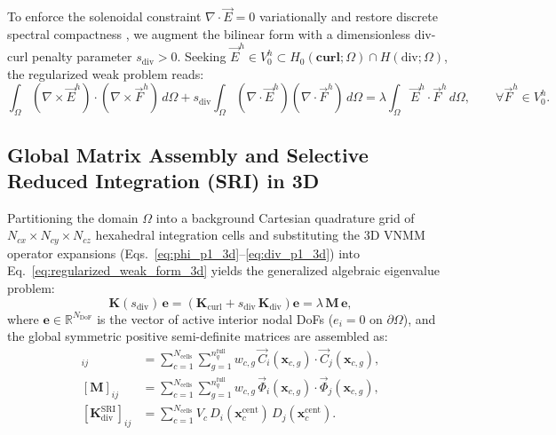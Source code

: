 \documentclass[preprint,12pt]{elsarticle}
\newcommand{\curl}{\nabla \times}
\newcommand{\divg}{\nabla \cdot}
\newcommand{\R}{\mathbb{R}}
\newcommand{\Hdiv}{H(\text{div};\Omega)}
\begin{document}
To enforce the solenoidal constraint $\divg\vec{E} = 0$ variationally and restore discrete spectral compactness \cite{Costabel2000, Boffi2010}, we augment the bilinear form with a dimensionless div-curl penalty parameter $s_{\text{div}} > 0$. Seeking $\vec{E}^h \in V_0^h \subset H_0(\mathbf{curl};\Omega) \cap \Hdiv$, the regularized weak problem reads:
\begin{equation}
    \int_\Omega (\curl\vec{E}^h)\cdot(\curl\vec{F}^h)\,d\Omega + s_{\text{div}} \int_\Omega (\divg\vec{E}^h)(\divg\vec{F}^h)\,d\Omega = \lambda \int_\Omega \vec{E}^h\cdot\vec{F}^h\,d\Omega, \qquad \forall \vec{F}^h \in V_0^h.
    \label{eq:regularized_weak_form_3d}
\end{equation}

\subsection{Global Matrix Assembly and Selective Reduced Integration (SRI) in 3D}
\label{subsec:sri_assembly_3d}

Partitioning the domain $\Omega$ into a background Cartesian quadrature grid of $N_{cx} \times N_{cy} \times N_{cz}$ hexahedral integration cells and substituting the 3D VNMM operator expansions (Eqs.~\eqref{eq:phi_p1_3d}--\eqref{eq:div_p1_3d}) into Eq.~\eqref{eq:regularized_weak_form_3d} yields the generalized algebraic eigenvalue problem:
\begin{equation}
    \mathbf{K}(s_{\text{div}})\,\mathbf{e} = \left( \mathbf{K}_{\text{curl}} + s_{\text{div}}\,\mathbf{K}_{\text{div}} \right)\mathbf{e} = \lambda\,\mathbf{M}\,\mathbf{e},
    \label{eq:discrete_eig_3d}
\end{equation}
where $\mathbf{e} \in \R^{N_{\text{DoF}}}$ is the vector of active interior nodal DoFs ($e_i = 0$ on $\partial\Omega$), and the global symmetric positive semi-definite matrices are assembled as:
\begin{align}
    [\mathbf{K}_{\text{curl}}]_{ij} &= \sum_{c=1}^{N_{\text{cells}}} \sum_{g=1}^{n_q^{\text{full}}} w_{c,g}\,\vec{C}_i(\mathbf{x}_{c,g}) \cdot \vec{C}_j(\mathbf{x}_{c,g}), \label{eq:K_curl_assembly_3d} \\
    [\mathbf{M}]_{ij} &= \sum_{c=1}^{N_{\text{cells}}} \sum_{g=1}^{n_q^{\text{full}}} w_{c,g}\,\vec{\Phi}_i(\mathbf{x}_{c,g}) \cdot \vec{\Phi}_j(\mathbf{x}_{c,g}), \label{eq:M_assembly_3d} \\
    [\mathbf{K}_{\text{div}}^{\text{SRI}}]_{ij} &= \sum_{c=1}^{N_{\text{cells}}} V_c\,D_i(\mathbf{x}_c^{\text{cent}})\,D_j(\mathbf{x}_c^{\text{cent}}). \label{eq:K_div_sri_3d}
\end{align}
\end{document}
